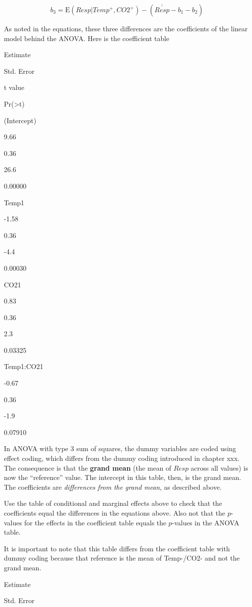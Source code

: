 \documentclass[]{book}
\begin{document}
\begin{equation}
b_3 = \mathrm{E}(Resp|Temp^+, CO2^+) - (\overline{\overline{Resp}} - b_1 - b_2)
\end{equation}

As noted in the equations, these three differences are the coefficients of the linear model behind the ANOVA. Here is the coefficient table

Estimate

Std. Error

t value

Pr(\textgreater\textbar t\textbar)

(Intercept)

9.66

0.36

26.6

0.00000

Temp1

-1.58

0.36

-4.4

0.00030

CO21

0.83

0.36

2.3

0.03325

Temp1:CO21

-0.67

0.36

-1.9

0.07910

In ANOVA with type 3 sum of squares, the dummy variables are coded using effect coding, which differs from the dummy coding introduced in chapter xxx. The consequence is that the \textbf{grand mean} (the mean of \(Resp\) across all values) is now the ``reference'' value. The intercept in this table, then, is the grand mean. The coefficients are \emph{differences from the grand mean}, as described above.

Use the table of conditional and marginal effects above to check that the coefficients equal the differences in the equations above. Also not that the \(p\)-values for the effects in the coefficient table equals the \(p\)-values in the ANOVA table.

It is important to note that this table differs from the coefficient table with dummy coding because that reference is the mean of Temp-/CO2- and not the grand mean.

Estimate

Std. Error
\end{document}
